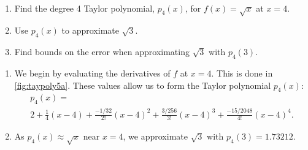\begin{example}\label{ex_taypoly5}
\mbox{}\\[-2\baselineskip]\begin{enumerate}
	\item	Find the degree 4 Taylor polynomial, $p_4(x)$, for $f(x)=\sqrt{x}$ at $x=4.$
	\item	Use $p_4(x)$ to approximate $\sqrt{3}$.
	\item	Find bounds on the error when approximating $\sqrt{3}$ with $p_4(3)$.
\end{enumerate}
\solution
\begin{enumerate}
	\item	We begin by evaluating the derivatives of $f$ at $x=4$. This is done in \autoref{fig:taypoly5a}. These values allow us to form the Taylor polynomial $p_4(x)$:
\begin{multline*}
p_4(x) = \\
2 + \frac14(x-4) +\frac{-1/32}{2!}(x-4)^2+\frac{3/256}{3!}(x-4)^3+\frac{-15/2048}{4!}(x-4)^4.
\end{multline*}

	\item	As $p_4(x) \approx \sqrt{x}$ near $x=4$, we approximate $\sqrt{3}$ with $p_4(3) = 1.73212$.


\end{enumerate}
\end{example}
